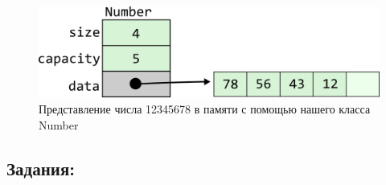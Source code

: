 \documentclass{article}
\begin{document}
\begin{figure}[h!]
  \centering
  \includegraphics[scale=1]{../images/number1.png}
  \caption{Представление числа 12345678 в памяти с помощью нашего класса Number}
  \label{fig:nummber1}
\end{figure}


\subsection*{Задания:}
\end{document}
